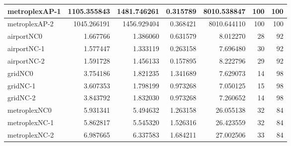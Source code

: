 \begin{longtable}{|l|r|r|r|r|r|r|}
metroplexAP-1 & 1105.355843 & 1481.746261 & 0.315789 & 8010.538847 & 100 & 100 \\ \hline
metroplexAP-2 & 1045.266191 & 1456.929404 & 0.368421 & 8010.644110 & 100 & 100 \\ \hline
airportNC0 & 1.667766 & 1.386060 & 0.631579 & 8.012270 & 28 & 92 \\ \hline
airportNC-1 & 1.577447 & 1.333119 & 0.263158 & 7.696480 & 30 & 92 \\ \hline
airportNC-2 & 1.591728 & 1.456133 & 0.157895 & 8.222796 & 29 & 92 \\ \hline
gridNC0 & 3.754186 & 1.821235 & 1.341689 & 7.629073 & 14 & 98 \\ \hline
gridNC-1 & 3.607353 & 1.798199 & 0.973268 & 7.050125 & 15 & 98 \\ \hline
gridNC-2 & 3.843792 & 1.832030 & 0.973268 & 7.260652 & 14 & 98 \\ \hline
metroplexNC0 & 5.931341 & 5.494632 & 1.263158 & 26.055138 & 32 & 84 \\ \hline
metroplexNC-1 & 5.862817 & 5.545320 & 1.526316 & 26.423559 & 32 & 84 \\ \hline
metroplexNC-2 & 6.987665 & 6.337583 & 1.684211 & 27.002506 & 33 & 84 \\ \hline
\end{longtable}
